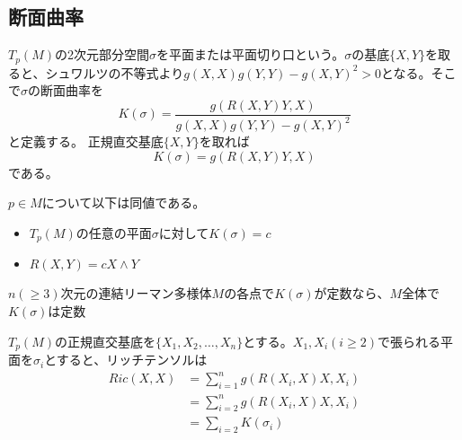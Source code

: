 \subsection{断面曲率}
    $T_p(M)$の2次元部分空間$\sigma$を平面または平面切り口という。$\sigma$の基底$\{X, Y\}$を取ると、シュワルツの不等式より$g(X, X)g(Y, Y) - g(X, Y)^2 > 0$となる。そこで$\sigma$の断面曲率を
        \[K(\sigma) = \frac{g(R(X, Y)Y, X)}{g(X, X)g(Y, Y) - g(X, Y)^2}\]
    と定義する。
    正規直交基底$\{X, Y\}$を取れば
        \[K(\sigma) = g(R(X, Y)Y, X)\]
    である。
    \begin{thm}
        $p \in M$について以下は同値である。
        \begin{itemize}
            \item $T_p(M)$の任意の平面$\sigma$に対して$K(\sigma) = c$
            \item $R(X, Y) = cX \wedge Y$
        \end{itemize}
    \end{thm}
    \begin{thm}[シューアの定理]
        $n(\geq 3)$次元の連結リーマン多様体$M$の各点で$K(\sigma)$が定数なら、$M$全体で$K(\sigma)$は定数
    \end{thm}

    $T_p(M)$の正規直交基底を$\{X_1, X_2, \dots, X_n\}$とする。$X_1, X_i(i \geq 2)$で張られる平面を$\sigma_i$とすると、リッチテンソルは
    \begin{align*}
        Ric(X, X)
            &= \sum_{i=1}^n g(R(X_i, X)X, X_i)\\
            &= \sum_{i=2}^n g(R(X_i, X)X, X_i)\\
            &= \sum_{i=2} K(\sigma_i)
    \end{align*}